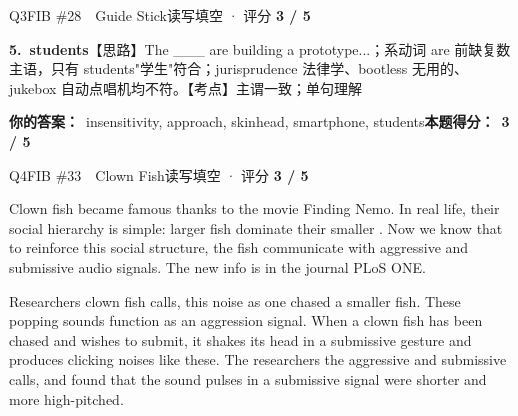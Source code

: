 \begin{qblock}{Q3\quad FIB \#28\ \ Guide Stick}{读写填空 · 评分 \textcolor{cAccent}{\bfseries 3 / 5}}
\begin{notebox}
\textbf{5.\ students}\quad【思路】The \_\_\_ are building a prototype...；系动词 are 前缺复数主语，只有 students"学生"符合；jurisprudence 法律学、bootless 无用的、jukebox 自动点唱机均不符。【考点】主谓一致；单句理解
\end{notebox}
\smallskip
\textbf{你的答案：}\ {\color{cWrong}insensitivity}, approach, {\color{cWrong}skinhead}, smartphone, students\qquad\textbf{本题得分：}\ {\color{cAccent}\bfseries 3 / 5}
\end{qblock}

\begin{qblock}{Q4\quad FIB \#33\ \ Clown Fish}{读写填空 · 评分 \textcolor{cAccent}{\bfseries 3 / 5}}
\begin{promptbox}
Clown fish became famous thanks to the movie Finding Nemo. In real life, their social hierarchy is simple: larger fish dominate their smaller . Now we know that to reinforce this social structure, the fish communicate with aggressive and submissive audio signals. The new info is in the journal PLoS ONE.

Researchers  clown fish calls,  this noise as one chased a smaller fish. These popping sounds function as an aggression signal. When a clown fish has been chased and wishes to submit, it shakes its head in a submissive gesture and produces clicking noises like these. The researchers  the aggressive and submissive calls, and found that the sound pulses in a submissive signal were shorter and more high-pitched.


\end{promptbox}
\end{qblock}
